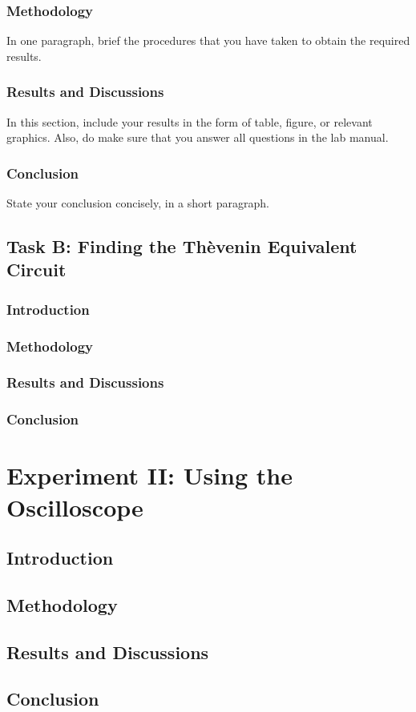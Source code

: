 \documentclass[11pt]{article}
\begin{document}
\subsubsection{Methodology}
In one paragraph, brief the procedures that you have taken to obtain the required results. 

\subsubsection{Results and Discussions}
In this section, include your results in the form of table, figure, or relevant graphics.  Also, do make sure that you answer all questions in the lab manual. 

\subsubsection{Conclusion}
State your conclusion concisely, in a short paragraph.

\subsection{Task B: Finding the Th\`{e}venin Equivalent Circuit}
\subsubsection{Introduction}

\subsubsection{Methodology}


\subsubsection{Results and Discussions}

\subsubsection{Conclusion}


\newpage

\section{Experiment II: Using the Oscilloscope}

\subsection{Introduction}

\subsection{Methodology}

\subsection{Results and Discussions}

\subsection{Conclusion}
\end{document}
